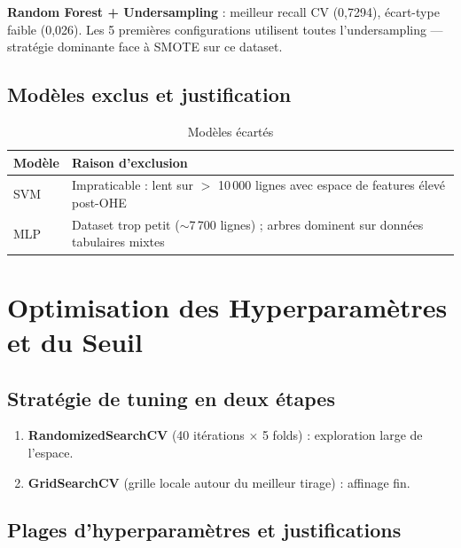 \documentclass[11pt,a4paper,twoside,openright]{report}
\begin{document}
\begin{resultbox}
\textbf{Random Forest + Undersampling} : meilleur recall CV (0,7294), écart-type faible (0,026). Les 5 premières configurations utilisent toutes l'undersampling — stratégie dominante face à SMOTE sur ce dataset.
\end{resultbox}

\section{Modèles exclus et justification}

\begin{table}[H]
  \centering
  \caption{Modèles écartés}
  \label{tab:excluded}
  \begin{tabularx}{\textwidth}{lX}
    \toprule
    \textbf{Modèle} & \textbf{Raison d'exclusion} \\
    \midrule
    SVM & Impraticable : lent sur $>$ 10\,000 lignes avec espace de features élevé post-OHE \\
    MLP & Dataset trop petit ($\sim$7\,700 lignes) ; arbres dominent sur données tabulaires mixtes \\
    \bottomrule
  \end{tabularx}
\end{table}

\chapter{Optimisation des Hyperparamètres et du Seuil}
\label{ch:tuning}

\section{Stratégie de tuning en deux étapes}

\begin{enumerate}
  \item \textbf{RandomizedSearchCV} (40 itérations $\times$ 5 folds) : exploration large de l'espace.
  \item \textbf{GridSearchCV} (grille locale autour du meilleur tirage) : affinage fin.
\end{enumerate}

\section{Plages d'hyperparamètres et justifications}
\end{document}
